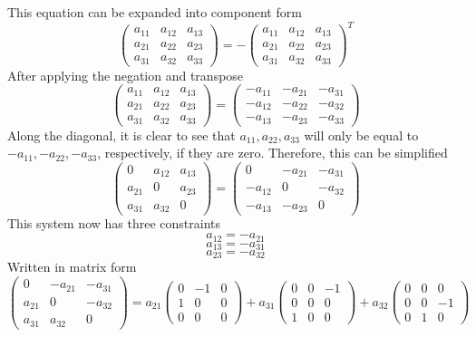 \documentclass{article}
\begin{document}
This equation can be expanded into component form
$$ \begin{pmatrix}
    a_{11} & a_{12} & a_{13} \\
    a_{21} & a_{22} & a_{23} \\
    a_{31} & a_{32} & a_{33}
\end{pmatrix} = - \begin{pmatrix}
    a_{11} & a_{12} & a_{13} \\
    a_{21} & a_{22} & a_{23} \\
    a_{31} & a_{32} & a_{33}
\end{pmatrix}^T $$
After applying the negation and transpose
$$ \begin{pmatrix}
    a_{11} & a_{12} & a_{13} \\
    a_{21} & a_{22} & a_{23} \\
    a_{31} & a_{32} & a_{33}
\end{pmatrix} = \begin{pmatrix}
    -a_{11} & -a_{21} & -a_{31} \\
    -a_{12} & -a_{22} & -a_{32} \\
    -a_{13} & -a_{23} & -a_{33}
\end{pmatrix} $$
Along the diagonal, it is clear to see that $ a_{11}, a_{22}, a_{33} $ will
only be equal to $ -a_{11}, -a_{22}, -a_{33} $, respectively, if they are
zero. Therefore, this can be simplified
$$ \begin{pmatrix}
    0 & a_{12} & a_{13} \\
    a_{21} & 0 & a_{23} \\
    a_{31} & a_{32} & 0
\end{pmatrix} = \begin{pmatrix}
    0 & -a_{21} & -a_{31} \\
    -a_{12} & 0 & -a_{32} \\
    -a_{13} & -a_{23} & 0
\end{pmatrix} $$
This system now has three constraints
$$ a_{12} = -a_{21} $$
$$ a_{13} = -a_{31} $$
$$ a_{23} = -a_{32} $$
Written in matrix form
$$ \begin{pmatrix}
    0 & -a_{21} & -a_{31} \\
    a_{21} & 0 & -a_{32} \\
    a_{31} & a_{32} & 0
\end{pmatrix} = a_{21} \begin{pmatrix}
    0 & -1 & 0 \\
    1 & 0 & 0 \\
    0 & 0 & 0
\end{pmatrix} + a_{31} \begin{pmatrix}
    0 & 0 & -1 \\
    0 & 0 & 0 \\
    1 & 0 & 0
\end{pmatrix} + a_{32} \begin{pmatrix}
    0 & 0 & 0 \\
    0 & 0 & -1 \\
    0 & 1 & 0
\end{pmatrix} $$
\end{document}
